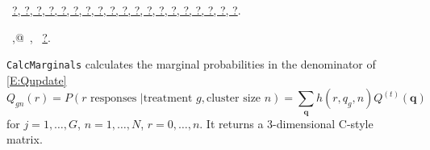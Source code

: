 \documentclass[reqno]{amsart}
\renewcommand{\NWlink}[2]{\hyperlink{#1}{#2}}
\newcommand{\bq}{\mathbf{q}}
\begin{document}
\begin{flushleft}
\begin{list}{}{\setlength{\itemsep}{-\parsep}\setlength{\itemindent}{-\leftmargin}}
\item \NWtxtFileDefBy\ \NWlink{nuweb?}{?}\NWlink{nuweb?}{, ?}\NWlink{nuweb?}{, ?}\NWlink{nuweb?}{, ?}\NWlink{nuweb?}{, ?}\NWlink{nuweb?}{, ?}\NWlink{nuweb?}{, ?}\NWlink{nuweb?}{, ?}\NWlink{nuweb?}{, ?}\NWlink{nuweb?}{, ?}\NWlink{nuweb?}{, ?}\NWlink{nuweb?}{, ?}\NWlink{nuweb?}{, ?}\NWlink{nuweb?}{, ?}\NWlink{nuweb?}{, ?}\NWlink{nuweb?}{, ?}\NWlink{nuweb?}{, ?}\NWlink{nuweb?}{, ?}\NWlink{nuweb?}{, ?}.
\item \NWtxtIdentsDefed\nobreak\  \verb@IndexVector,@\nobreak\ \NWtxtIdentsNotUsed, \verb@IndexVectorC@\nobreak\ \NWlink{nuweb?}{?}.
\item{}
\end{list}
\vspace{4ex}
\end{flushleft}
\texttt{CalcMarginals} calculates the marginal probabilities in the denominator
of \eqref{E:Qupdate}
\begin{equation}
 Q_{gn}(r)= P(r \text{ responses } | \text{treatment }g, \text{cluster size }n)=
 \sum_\bq h(r,q_g,n) Q^{(t)}(\bq)
\end{equation}
for $j=1,\ldots, G$, $n=1,\ldots, N$, $r=0,\ldots,n$. It returns a 3-dimensional 
C-style matrix.
\end{document}
